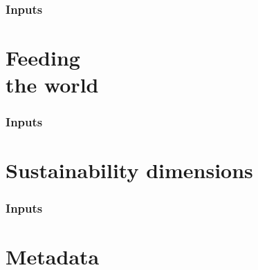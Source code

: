 \documentclass[print,Draft]{faosyb}
\begin{document}
\begin{tablepages}
\section{Inputs}
\small
  
\clearpage

\end{tablepages}


\part[Feeding the world]{Feeding\\ the world}
\lipsum
\EndPartIntro




\begin{tablepages}
\section{Inputs}
\small
  
\clearpage

\end{tablepages}


\part[Sustainability dimensions]{Sustain\-ability dimensions}
\lipsum
\EndPartIntro




\begin{tablepages}
\section{Inputs}
\small
  
\clearpage

\end{tablepages}



\part{Metadata}
\end{document}
